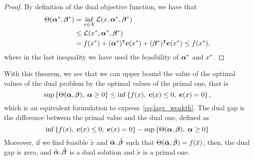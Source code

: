 \begin{proof}
    By definition of the dual objective function, we have that 
    \begin{align*}
        \Theta({\bm{\alpha}}^*, {\bm{\beta}}^*) &= \inf_{x \in \mathcal{X}} \mathcal{L}(x, {\bm{\alpha}}^*, {\bm{\beta}}^*) \\
        &\leq \mathcal{L}({x}^*, {\bm{\alpha}}^*, {\bm{\beta}}^*) \\
        &= f({x}^*) + ({\bm{\alpha}}^*)^\intercal \bm{c}({x}^*) + ({\bm{\beta}}^*)^\intercal \bm{e}({x}^*) \leq f({x}^*) ,
    \end{align*}
    where in the last inequality we have used the feasibility of ${\bm{\alpha}}^*$ and ${x}^*$.
\end{proof}
With this theorem, we see that we can upper bound the value of the optimal values of the dual problem by the optimal values of the primal one, that is 
\begin{equation}
    \nonumber
    \sup \left\{\Theta(\bm{\alpha}, \bm{\beta}),\;  \bm{\alpha} \geq 0\right\} \leq \inf \left\{f(x), \; \bm{c}(x) \leq 0,\; \bm{e}(x)=0 \right\} ,
\end{equation}
which is an equivalent formulation to express~\eqref{eq:lagr_weakth}.
The dual gap is the difference between the primal value and the dual one, defined as 
\begin{equation}
    \nonumber
    \inf \left\{f(x), \; \bm{c}(x) \leq 0,\; \bm{e}(x)=0 \right\} - \sup \left\{\Theta(\bm{\alpha}, \bm{\beta}),\;  \bm{\alpha} \geq 0\right\}
\end{equation}
Moreover, if we find feasible $\tilde{x}$ and $\tilde{\bm{\alpha}}, \tilde{\bm{\beta}}$ such that $\Theta(\tilde{\bm{\alpha}}, \tilde{\bm{\beta}}) = f(\tilde{x})$, then, the dual gap is zero, and $\tilde{\bm{\alpha}}, \tilde{\bm{\beta}}$ is a dual solution and $\tilde{x}$ is a primal one.
%

